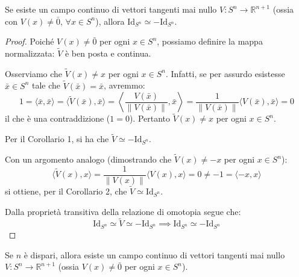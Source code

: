 \begin{prop}
Se esiste un campo continuo di vettori tangenti mai nullo $V: S^n \to \mathbb{R}^{n+1}$ (ossia con $V(x) \neq \bar{0}, \, \forall x \in S^n$), allora $\mathrm{Id}_{S^n} \simeq -\mathrm{Id}_{S^n}$.
\end{prop}

\begin{proof}
Poiché $V(x) \neq \bar{0}$ per ogni $x \in S^n$, possiamo definire la mappa normalizzata:
$\widetilde{V}$ è ben posta e continua. 

Osserviamo che $\widetilde{V}(x) \neq x$ per ogni $x \in S^n$. Infatti, se per assurdo esistesse $\bar{x} \in S^n$ tale che $\widetilde{V}(\bar{x}) = \bar{x}$, avremmo:
\[
1 = \langle \bar{x}, \bar{x} \rangle = \langle \widetilde{V}(\bar{x}), \bar{x} \rangle = \left\langle \frac{V(\bar{x})}{\|V(\bar{x})\|}, \bar{x} \right\rangle = \frac{1}{\|V(\bar{x})\|} \langle V(\bar{x}), \bar{x} \rangle = 0
\]
il che è una contraddizione ($1 = 0$). Pertanto $\widetilde{V}(x) \neq x$ per ogni $x \in S^n$.

Per il Corollario 1, si ha che $\widetilde{V} \simeq -\mathrm{Id}_{S^n}$.

Con un argomento analogo (dimostrando che $\widetilde{V}(x) \neq -x$ per ogni $x \in S^n$):
\[
\langle \widetilde{V}(x), x \rangle = \frac{1}{\|V(x)\|} \langle V(x), x \rangle = 0 \neq -1 = \langle -x, x \rangle
\]
si ottiene, per il Corollario 2, che $\widetilde{V} \simeq \mathrm{Id}_{S^n}$.

Dalla proprietà transitiva della relazione di omotopia segue che:
\[
\mathrm{Id}_{S^n} \simeq \widetilde{V} \simeq -\mathrm{Id}_{S^n} \implies \mathrm{Id}_{S^n} \simeq -\mathrm{Id}_{S^n}
\]
\end{proof}

\begin{prop}
Se $n$ è dispari, allora esiste un campo continuo di vettori tangenti mai nullo $V: S^n \to \mathbb{R}^{n+1}$ (ossia $V(x) \neq \bar{0}$ per ogni $x \in S^n$).
\end{prop}

